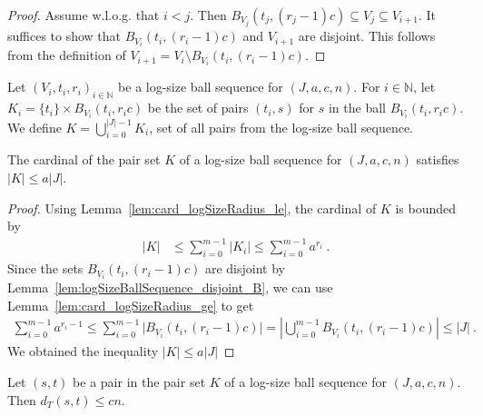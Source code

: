 \begin{proof}
Assume w.l.o.g. that $i < j$.
Then $B_{V_j}(t_j, (r_j-1)c) \subseteq V_j \subseteq V_{i+1}$.
It suffices to show that $B_{V_i}(t_i, (r_i-1)c)$ and $V_{i+1}$ are disjoint.
This follows from the definition of $V_{i+1} = V_i \setminus B_{V_i}(t_i, (r_i-1)c)$.
\end{proof}


\begin{definition}\label{def:pairSet}
  \leanok
Let $(V_i, t_i, r_i)_{i \in \mathbb{N}}$ be a log-size ball sequence for $(J, a, c, n)$.
For $i \in \mathbb{N}$, let $K_i = \{t_i\} \times B_{V_i}(t_i, r_i c)$ be the set of pairs $(t_i, s)$ for $s$ in the ball $B_{V_i}(t_i, r_i c)$.
We define $K = \bigcup_{i=0}^{\vert J \vert-1} K_i$, set of all pairs from the log-size ball sequence.
\end{definition}


\begin{lemma}\label{lem:card_pairSet_le}
  \leanok
The cardinal of the pair set $K$ of a log-size ball sequence for $(J, a, c, n)$ satisfies $|K| \le a |J|$.
\end{lemma}

\begin{proof}
Using Lemma~\ref{lem:card_logSizeRadius_le}, the cardinal of $K$ is bounded by
\begin{align*}
  \vert K \vert
  &\le \sum_{i=0}^{m-1} \vert K_i \vert
  \le \sum_{i=0}^{m-1} a^{r_i}
  \: .
\end{align*}
Since the sets $B_{V_i}(t_i, (r_i-1)c)$ are disjoint by Lemma~\ref{lem:logSizeBallSequence_disjoint_B}, we can use Lemma~\ref{lem:card_logSizeRadius_ge} to get
\begin{align*}
  \sum_{i=0}^{m-1} a^{r_i - 1}
  \le \sum_{i=0}^{m-1} \vert B_{V_i}(t_i, (r_i-1)c) \vert
  = \left\vert \bigcup_{i=0}^{m-1} B_{V_i}(t_i, (r_i-1)c) \right\vert
  \le \vert J \vert
  \: .
\end{align*}
We obtained the inequality $\vert K \vert \le a \vert J \vert$
\end{proof}


\begin{lemma}\label{lem:dist_le_of_mem_pairSet}
  \leanok
Let $(s, t)$ be a pair in the pair set $K$ of a log-size ball sequence for $(J, a, c, n)$.
Then $d_T(s, t) \le c n$.
\end{lemma}

